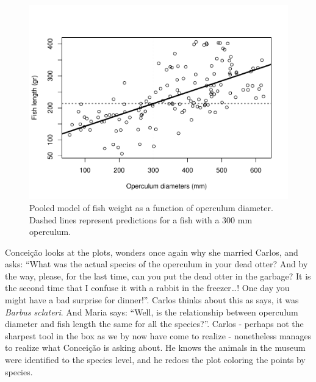 \documentclass[
]{book}
\newenvironment{Shaded}{\begin{snugshade}}{\end{snugshade}}
\newcommand{\CommentTok}[1]{\textcolor[rgb]{0.56,0.35,0.01}{\textit{#1}}}
\newcommand{\DataTypeTok}[1]{\textcolor[rgb]{0.13,0.29,0.53}{#1}}
\newcommand{\DecValTok}[1]{\textcolor[rgb]{0.00,0.00,0.81}{#1}}
\newcommand{\KeywordTok}[1]{\textcolor[rgb]{0.13,0.29,0.53}{\textbf{#1}}}
\newcommand{\NormalTok}[1]{#1}
\newcommand{\OperatorTok}[1]{\textcolor[rgb]{0.81,0.36,0.00}{\textbf{#1}}}
\newcommand{\StringTok}[1]{\textcolor[rgb]{0.31,0.60,0.02}{#1}}
\begin{document}
\begin{Shaded}
\end{Shaded}

\begin{figure}

{\centering \includegraphics[width=0.8\linewidth]{ECOMODbook_files/figure-latex/wod-1} 

}

\caption{Pooled model of fish weight as a function of operculum diameter. Dashed lines represent predictions for a fish with a 300 mm operculum.}\label{fig:wod}
\end{figure}

Conceição looks at the plots, wonders once again why she married Carlos, and asks: ``What was the actual species of the operculum in your dead otter? And by the way, please, for the last time, can you put the dead otter in the garbage? It is the second time that I confuse it with a rabbit in the freezer\ldots! One day you might have a bad surprise for dinner!''. Carlos thinks about this as says, it was \emph{Barbus sclateri}. And Maria says: ``Well, is the relationship between operculum diameter and fish length the same for all the species?''. Carlos - perhaps not the sharpest tool in the box as we by now have come to realize - nonetheless manages to realize what Conceição is asking about. He knows the animals in the museum were identified to the species level, and he redoes the plot coloring the points by species.
\end{document}
